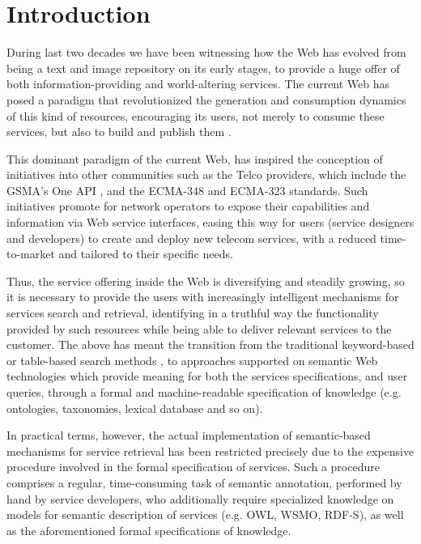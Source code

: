 \section{Introduction}

\noindent During last two decades we have been witnessing how the Web has evolved from being a text and image repository on its early stages, to provide a huge offer of both information-providing and world-altering services. The current Web has posed a paradigm that revolutionized the generation and consumption dynamics of this kind of resources, encouraging its users, not merely to consume these services, but also to build and publish them \cite{Yelmo:2011}.

This dominant paradigm of the current Web, has inspired the conception of initiatives into other communities such as the Telco providers, which include the GSMA’s One API \cite{GSMA:2013}, and the ECMA-348 \cite{ECMA:2012} and ECMA-323 \cite{ECMA:2011} standards. Such initiatives promote for network operators to expose their capabilities and information via Web service interfaces, easing this way for users (service designers and developers) to create and deploy new telecom services, with a reduced time-to-market and tailored to their specific needs.

Thus, the service offering inside the Web is diversifying and steadily growing, so it is necessary to provide the users with increasingly intelligent mechanisms for services search and retrieval, identifying in a truthful way the functionality provided by such resources while being able to deliver relevant services to the customer. The above has meant the transition from the traditional keyword-based or table-based search methods \cite{Bernstein:2002}, to approaches supported on semantic Web technologies \cite{Chance:2009} which provide meaning for both the services specifications, and user queries, through a formal and machine-readable specification of knowledge (e.g. ontologies, taxonomies, lexical database and so on).

In practical terms, however, the actual implementation of semantic-based mechanisms for service retrieval has been restricted precisely due to the expensive procedure involved in the formal specification of services. Such a procedure comprises a regular, time-consuming task of semantic annotation, performed by hand by service developers, who additionally require specialized knowledge on models for semantic description of services (e.g. OWL, WSMO, RDF-S), as well as the aforementioned formal specifications of knowledge.

